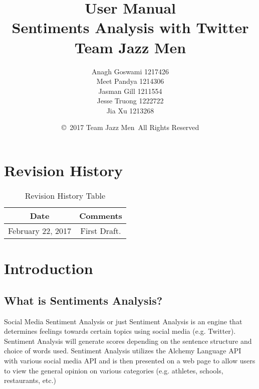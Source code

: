 \documentclass[12pt, titlepage]{article}
\begin{document}
\title{User Manual\\  Sentiments Analysis with Twitter \\Team Jazz Men}
\author{Anagh Goswami 1217426 \\ Meet Pandya 1214306 \\ Jasman Gill  1211554 \\ Jesse Truong  1222722 \\ Jia Xu  1213268 \\}
\date{\copyright\ 2017 Team Jazz Men\    All Rights Reserved} 

\maketitle

\maketitle

\tableofcontents 
\listoffigures

\listoftables

\begin{table}[H]
\section*{Revision History}
\begin{tabular}{|c|c|}
\hline
\textbf{Date}  & \textbf{Comments} \\ \hline
February 22, 2017 &  First Draft. \\ 
\hline

\end{tabular}
\caption{Revision History Table}
\end{table}

\newpage


\section{Introduction}

\subsection{What is Sentiments Analysis?}
Social Media Sentiment Analysis or just Sentiment Analysis is an engine that determines feelings towards certain topics using social media (e.g. Twitter). Sentiment Analysis will generate scores depending on the sentence structure and choice of words used. Sentiment Analysis utilizes the Alchemy Language API with various social media API and is then presented on a web page to allow users to view the general opinion on various categories (e.g. athletes, schools, restaurants, etc.) 
\end{document}
